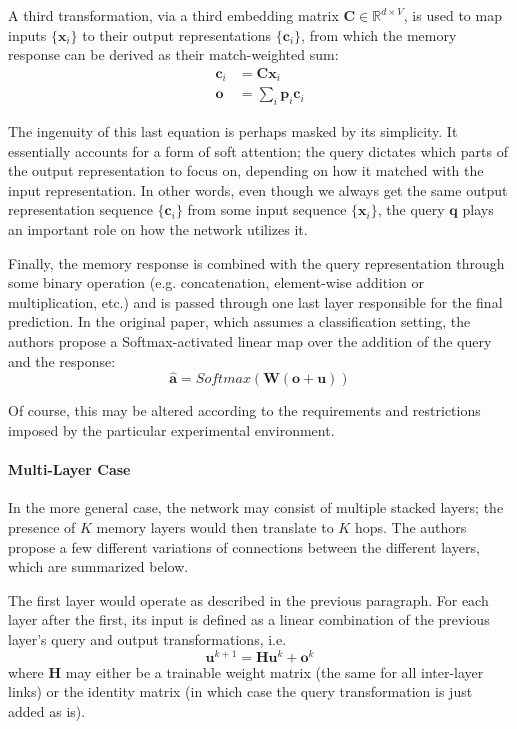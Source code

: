 \documentclass[]{article}
\begin{document}
A third transformation, via a third embedding matrix $\pmb{C} \in \mathbb{R}^{d\times V}$, is used to map inputs $\{\pmb{x}_i\}$ to their output representations $\{\pmb{c}_i\}$, from which the memory response can be derived as their match-weighted sum:
\begin{align}
\tag{Output Transformation}
\pmb{c}_i &= \pmb{C}\pmb{x}_i\\
\tag{Memory Response}
\pmb{o} &= \sum\limits_i{\pmb{p}_i\pmb{c}_i}
\end{align}

The ingenuity of this last equation is perhaps masked by its simplicity. It essentially accounts for a form of soft attention; the query dictates which parts of the output representation to focus on, depending on how it matched with the input representation. In other words, even though we always get the same output representation sequence $\{\pmb{c}_i\}$ from some input sequence $\{\pmb{x}_i\}$, the query $\pmb{q}$ plays an important role on how the network utilizes it.

Finally, the memory response is combined with the query representation through some binary operation (e.g. concatenation, element-wise addition or multiplication, etc.) and is passed through one last layer responsible for the final prediction. In the original paper, which assumes a classification setting, the authors propose a Softmax-activated linear map over the addition of the query and the response:
\[
\tag{Final Prediction}
\hat{\pmb{a}} = Softmax(\pmb{W} (\pmb{o}+\pmb{u}))
\]

Of course, this may be altered according to the requirements and restrictions imposed by the particular experimental environment. 

\paragraph{Multi-Layer Case}
In the more general case, the network may consist of multiple stacked layers; the presence of $K$ memory layers would then translate to $K$ hops. The authors propose a few different variations of connections between the different layers, which are summarized below. 

The first layer would operate as described in the previous paragraph. For each layer after the first, its input is defined as a linear combination of the previous layer's query and output transformations, i.e.
\[
\tag{Next Query}
\pmb{u}^{k+1} = \pmb{H}\pmb{u}^{k} + \pmb{o}^k 
\]
where $\pmb{H}$ may either be a trainable weight matrix (the same for all inter-layer links) or the identity matrix (in which case the query transformation is just added as is).
\end{document}
